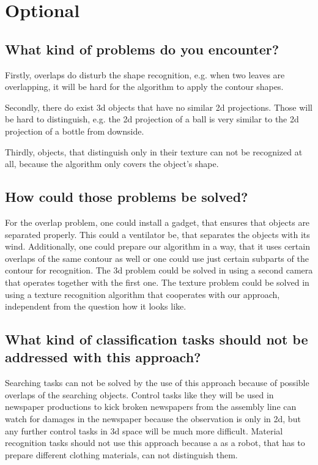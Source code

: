 \documentclass[a4paper,headings=small]{scrartcl}
\numberwithin{equation}{section} %
\numberwithin{figure}{section}   %
\begin{document}
\section{Optional}

\subsection{What kind of problems do you encounter?}

Firstly, overlaps do disturb the shape recognition, e.g. when two leaves are overlapping,
it will be hard for the algorithm to apply the contour shapes.

Secondly, there do exist 3d objects that have no similar 2d projections. Those will be hard to distinguish,
e.g. the 2d projection of a ball is very similar to the 2d projection of a bottle from downside.

Thirdly, objects, that distinguish only in their texture can not be recognized at all, 
because the algorithm only covers the object's shape.

\subsection{How could those problems be solved?}

For the overlap problem, one could install a gadget, that ensures that objects are separated properly.
This could a ventilator be, that separates the objects with its wind. 
Additionally, one could prepare our algorithm in a way, that it uses certain overlaps of the same
contour as well or one could use just certain subparts of the contour for recognition.
The 3d problem could be solved in using a second camera that operates together with the first one.
The texture problem could be solved in using a texture recognition algorithm that cooperates with
our approach, independent from the question how it looks like.

\subsection{What kind of classification tasks should not be addressed with
this approach?}

Searching tasks can not be solved by the use of this approach because of possible overlaps
of the searching objects.
Control tasks like they will be used in newspaper productions to kick broken newspapers from
the assembly line can watch for damages in the newspaper because the observation is only in 2d,
but any further control tasks in 3d space will be much more difficult.
Material recognition tasks should not use this approach 
because a as a robot, that has to prepare different clothing materials, can not distinguish them.
\end{document}
